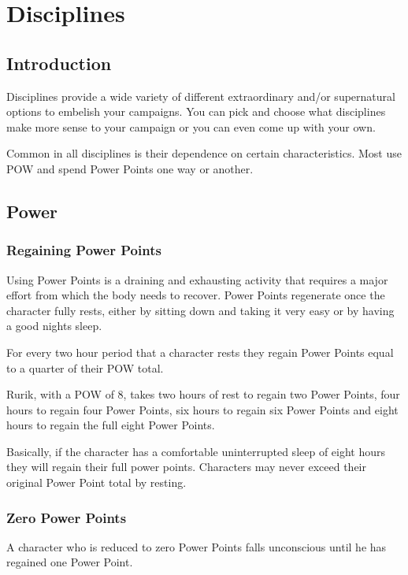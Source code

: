\chapter{Disciplines}
\label{ch:disciplines}

\section{Introduction}
Disciplines provide a wide variety of different extraordinary and/or supernatural options to embelish your campaigns. You can pick and choose what disciplines make more sense to your campaign or you can even come up with your own.

Common in all disciplines is their dependence on certain characteristics. Most use POW and spend Power Points one way or another.

\section{Power}

\subsection{Regaining Power Points}
Using Power Points is a draining and exhausting activity that requires a major effort from which the body needs to recover. Power Points regenerate once the character fully rests, either by sitting down and taking it very easy or by having a good nights sleep. 

For every two hour period that a character rests they regain Power Points equal to a quarter of their POW total.  

\begin{rpg-examplebox}
Rurik, with a POW of 8, takes two hours of rest to regain two Power Points, four hours to regain four Power Points, six hours to regain six Power Points and eight hours to regain the full eight Power Points. 
\end{rpg-examplebox}

Basically, if the character has a comfortable uninterrupted sleep of eight hours they will regain their full power points. Characters may never exceed their original Power Point total by resting.

\subsection{Zero Power Points}
A character who is reduced to zero Power Points falls unconscious until he has regained one Power Point.

